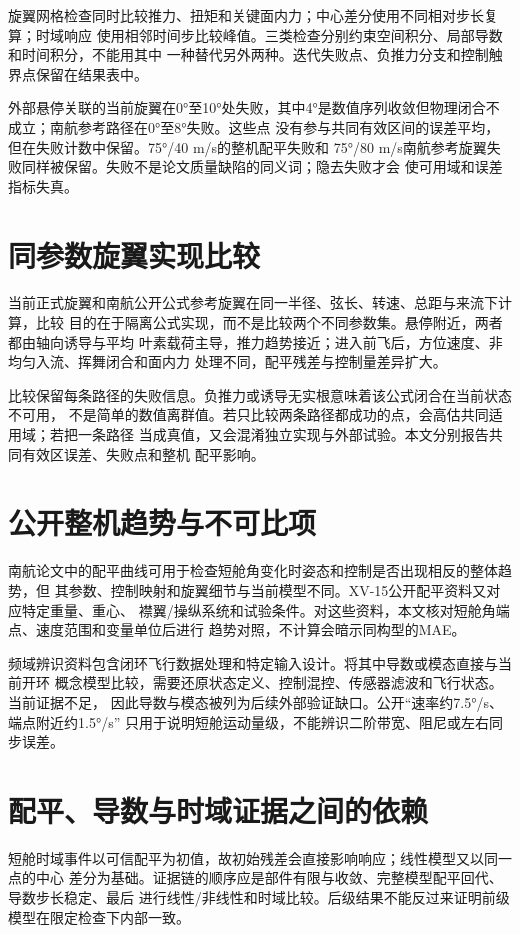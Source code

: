 \documentclass[UTF8,12pt,oneside,openany,fontset=windows]{ctexbook}
\begin{document}
旋翼网格检查同时比较推力、扭矩和关键面内力；中心差分使用不同相对步长复算；时域响应 使用相邻时间步比较峰值。三类检查分别约束空间积分、局部导数和时间积分，不能用其中 一种替代另外两种。迭代失败点、负推力分支和控制触界点保留在结果表中。

外部悬停关联的当前旋翼在0°至10°处失败，其中4°是数值序列收敛但物理闭合不成立；南航参考路径在0°至8°失败。这些点 没有参与共同有效区间的误差平均，但在失败计数中保留。75°/40 m/s的整机配平失败和 75°/80 m/s南航参考旋翼失败同样被保留。失败不是论文质量缺陷的同义词；隐去失败才会 使可用域和误差指标失真。

\section{同参数旋翼实现比较}

当前正式旋翼和南航公开公式参考旋翼在同一半径、弦长、转速、总距与来流下计算，比较 目的在于隔离公式实现，而不是比较两个不同参数集。悬停附近，两者都由轴向诱导与平均 叶素载荷主导，推力趋势接近；进入前飞后，方位速度、非均匀入流、挥舞闭合和面内力 处理不同，配平残差与控制量差异扩大。

比较保留每条路径的失败信息。负推力或诱导无实根意味着该公式闭合在当前状态不可用， 不是简单的数值离群值。若只比较两条路径都成功的点，会高估共同适用域；若把一条路径 当成真值，又会混淆独立实现与外部试验。本文分别报告共同有效区误差、失败点和整机 配平影响。

\section{公开整机趋势与不可比项}

南航论文中的配平曲线可用于检查短舱角变化时姿态和控制是否出现相反的整体趋势，但 其参数、控制映射和旋翼细节与当前模型不同。XV-15公开配平资料又对应特定重量、重心、 襟翼/操纵系统和试验条件。对这些资料，本文核对短舱角端点、速度范围和变量单位后进行 趋势对照，不计算会暗示同构型的MAE。

频域辨识资料包含闭环飞行数据处理和特定输入设计。将其中导数或模态直接与当前开环 概念模型比较，需要还原状态定义、控制混控、传感器滤波和飞行状态。当前证据不足， 因此导数与模态被列为后续外部验证缺口。公开“速率约7.5°/s、端点附近约1.5°/s” 只用于说明短舱运动量级，不能辨识二阶带宽、阻尼或左右同步误差。

\section{配平、导数与时域证据之间的依赖}

短舱时域事件以可信配平为初值，故初始残差会直接影响响应；线性模型又以同一点的中心 差分为基础。证据链的顺序应是部件有限与收敛、完整模型配平回代、导数步长稳定、最后 进行线性/非线性和时域比较。后级结果不能反过来证明前级模型在限定检查下内部一致。
\end{document}
